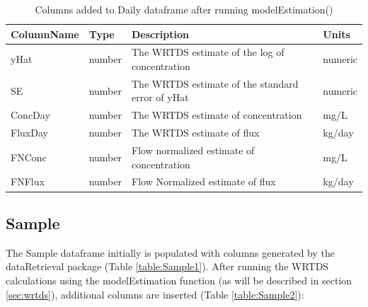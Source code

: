 \documentclass[a4paper,11pt]{article}\usepackage[]{graphicx}\usepackage[]{color}
\begin{document}
\begin{table}[!ht]
\centering
\caption{Columns added to Daily dataframe after running modelEstimation()} 
\label{table:Daily2}
\begin{tabular}{llll}
  \hline
ColumnName & Type & Description & Units \\ 
  \hline
yHat & number & The WRTDS estimate of the log of concentration & numeric \\ 
  SE & number & The WRTDS estimate of the standard error of yHat & numeric \\ 
  ConcDay & number & The WRTDS estimate of concentration & mg/L \\ 
  FluxDay & number & The WRTDS estimate of flux & kg/day \\ 
  FNConc & number & Flow normalized estimate of concentration & mg/L \\ 
  FNFlux & number & Flow Normalized estimate of flux & kg/day \\ 
   \hline
\end{tabular}
\end{table}

\FloatBarrier
\pagebreak


\subsection{Sample}
\label{sec:dataframesSample}
The Sample dataframe initially is populated with columns generated by the dataRetrieval package (Table \ref{table:Sample1}). After running the WRTDS calculations using the modelEstimation function (as will be described in section \ref{sec:wrtds}), additional columns are inserted (Table \ref{table:Sample2}):
\end{document}
